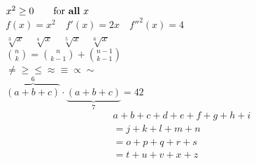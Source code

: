\documentclass{ctexart}
\begin{document}
$x^{2} \geq 0 \qquad
\text{for \textbf{all} }
x$ \\
$f(x) = x^2 \quad f'(x) = 2x \quad f''^{2}(x) = 4$ \\
$ \sqrt[3]{x} \quad \sqrt[4]{x} \quad \sqrt[5]{x} \quad \sqrt[6]{x} $\\
$ \binom{n}{k} = \binom{n}{k-1} + \binom{n-1}{k-1} $\\
$ \ne \ge \le \approx \equiv \propto \sim $ \\
$ \overbrace{(a+b+c)}^6 \cdot \underbrace{(a+b+c)}_7 = 42 $ \\


\begin{multline}
a + b + c + d + e + f + g + h + i \\
= j + k + l + m + n\\
= o + p + q + r + s\\
= t + u + v + x + z
\end{multline}
\end{document}
